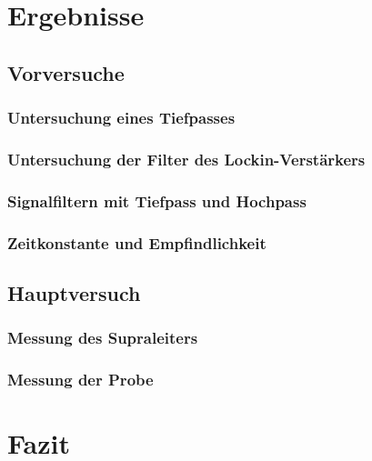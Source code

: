 \documentclass[12pt,a4paper]{article}
\begin{document}
\section{Ergebnisse}
\subsection{Vorversuche}
\subsubsection{Untersuchung eines Tiefpasses}
\subsubsection{Untersuchung der Filter des Lockin-Verstärkers}
\subsubsection{Signalfiltern mit Tiefpass und Hochpass}
\subsubsection{Zeitkonstante und Empfindlichkeit}
\subsection{Hauptversuch}
\subsubsection{Messung des Supraleiters}
\subsubsection{Messung der Probe}

\section{Fazit}
\end{document}
